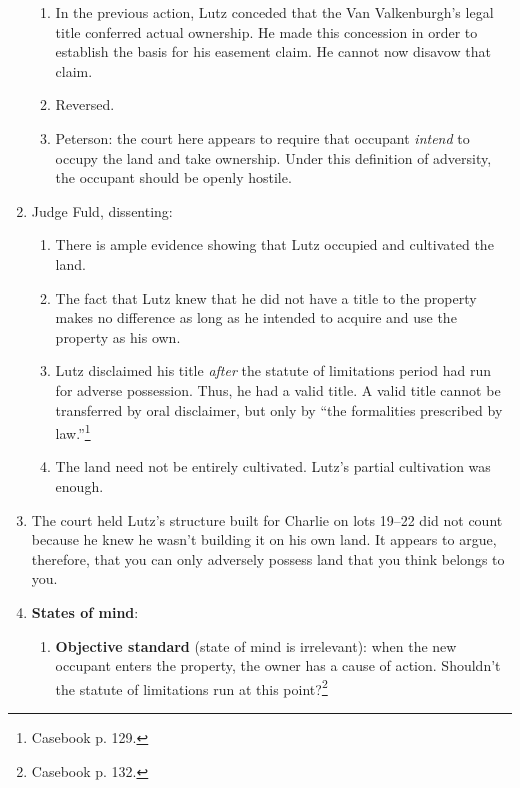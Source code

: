 \begin{enumerate}
\begin{enumerate}
        \item In the previous action, Lutz conceded that the Van 
        Valkenburgh's legal title conferred actual ownership. He made this 
        concession in order to establish the basis for his easement claim. 
        He cannot now disavow that claim.
        \item Reversed.
        \item Peterson: the court here appears to require that occupant 
        \emph{intend} to occupy the land and take ownership. Under this 
        definition of adversity, the occupant should be openly hostile.
    \end{enumerate}
    \item Judge Fuld, dissenting:
    \begin{enumerate}
        \item There is ample evidence showing that Lutz occupied and 
        cultivated the land.
        \item The fact that Lutz knew that he did not have a title to the 
        property makes no difference as long as he intended to acquire and use 
        the property as his own.
        \item Lutz disclaimed his title \emph{after} the statute of 
        limitations period had run for adverse possession. Thus, he had a 
        valid title. A valid title cannot be transferred by oral disclaimer, 
        but only by ``the formalities prescribed by law.''\footnote{Casebook 
        p. 129.}
        \item The land need not be entirely cultivated. Lutz's partial 
        cultivation was enough.
    \end{enumerate}
    \item The court held Lutz's structure built for Charlie on 
    lots 19--22 did not count because he knew he wasn't building it on his own 
    land. It appears to argue, therefore, that you can only adversely possess land 
    that you think belongs to you.
    \item \textbf{States of mind}:
    \begin{enumerate}
        \item \textbf{Objective standard} (state of mind is irrelevant): when 
        the new occupant enters the property, the owner has a cause of action. 
        Shouldn't the statute of limitations run at this 
        point?\footnote{Casebook p. 132.}

\end{enumerate}
\end{enumerate}
